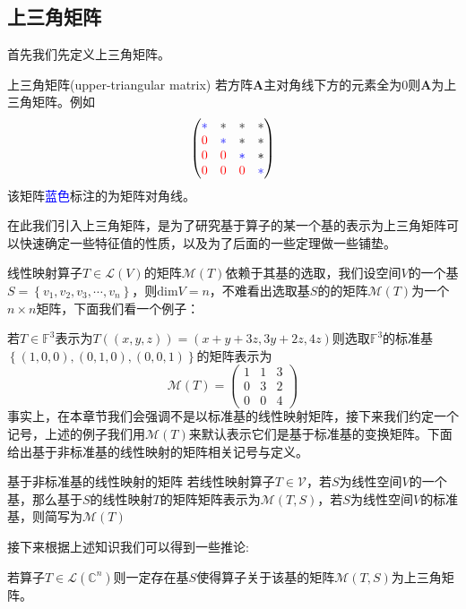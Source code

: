 \subsection{上三角矩阵}

首先我们先定义上三角矩阵。

\begin{definition}{上三角矩阵(upper-triangular matrix)}
	若方阵$\mathbf{A}$主对角线下方的元素全为0则$\mathbf{A}$为上三角矩阵。例如$$\begin{pmatrix}
 \textcolor{blue}{*}  & * & * & *\\
 \textcolor{red}{0}  & \textcolor{blue}{*} & * & *\\
 \textcolor{red}{0} & \textcolor{red}{0} & \textcolor{blue}{*} & *\\
 \textcolor{red}{0} & \textcolor{red}{0} & \textcolor{red}{0} & \textcolor{blue}{*}
\end{pmatrix}$$该矩阵\textcolor{blue}{蓝色}标注的为矩阵对角线。
\end{definition}

在此我们引入上三角矩阵，是为了研究基于算子的某一个基的表示为上三角矩阵可以快速确定一些特征值的性质，以及为了后面的一些定理做一些铺垫。

线性映射算子$T\in\mathcal{L}(V)$的矩阵$\mathcal{M}(T)$依赖于其基的选取，我们设空间$V$的一个基$S=\left\{ v_1,v_2,v_3,\cdots,v_n \right\}$，则$\text{dim}V=n$，不难看出选取基$S$的的矩阵$\mathcal{M}(T)$为一个$n\times n$矩阵，下面我们看一个例子：

若$T\in \mathcal{\mathbb{F}^3}$表示为$T((x,y,z))=(x+y+3z,3y+2z,4z)$则选取$\mathbb{F}^3$的标准基$\left\{ (1,0,0),(0,1,0),(0,0,1) \right\}$的矩阵表示为$$\mathcal{M}(T)=\begin{pmatrix}
 1 & 1 & 3\\
 0 & 3 & 2\\
 0 & 0 & 4
\end{pmatrix}$$事实上，在本章节我们会强调不是以标准基的线性映射矩阵，接下来我们约定一个记号，上述的例子我们用$\mathcal{M}(T)$来默认表示它们是基于标准基的变换矩阵。下面给出基于非标准基的线性映射的矩阵相关记号与定义。
\begin{definition}{基于非标准基的线性映射的矩阵}
	若线性映射算子$T\in\mathcal{V}$，若$S$为线性空间$V$的一个基，那么基于$S$的线性映射$T$的矩阵矩阵表示为$\mathcal{M}(T,S)$，若$S$为线性空间$V$的标准基，则简写为$\mathcal{M}(T)$
\end{definition}

接下来根据上述知识我们可以得到一些推论:

\begin{corollary}
	若算子$T\in\mathcal{L}(\mathbb{C}^n)$则一定存在基$S$使得算子关于该基的矩阵$\mathcal{M}(T,S)$为上三角矩阵。
\end{corollary}

